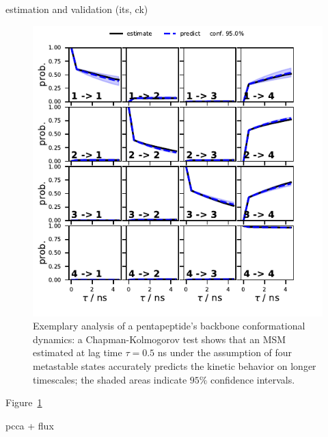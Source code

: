 \documentclass[9pt,tutorial,lineno,onehalfspacing]{livecoms}
\begin{document}
estimation and validation (its, ck)

\begin{figure}
\includegraphics{figure_2}
\caption{Exemplary analysis of a pentapeptide's backbone conformational dynamics: a Chapman-Kolmogorov test shows that an MSM estimated at lag time $\tau=0.5$ ns under the assumption of four metastable states accurately predicts the kinetic behavior on longer timescales; the shaded areas indicate $95\%$ confidence intervals.}
\label{fig:ck}
\end{figure}

Figure~\ref{fig:ck}

pcca + flux
\end{document}
